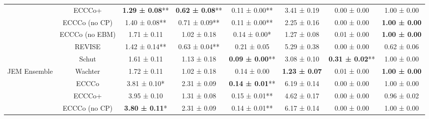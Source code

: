 \begin{table}
{\begin{tabular}[t]{cccccccc}
 & ECCCo+ & \textbf{1.29 ± 0.08}** & \textbf{0.62 ± 0.08}** & 0.11 ± 0.00** & 3.41 ± 0.19\hphantom{*}\hphantom{*} & 0.00 ± 0.00\hphantom{*}\hphantom{*} & 1.00 ± 0.00\hphantom{*}\hphantom{*}\\

 & ECCCo (no CP) & 1.40 ± 0.08** & 0.71 ± 0.09** & 0.11 ± 0.00** & 2.25 ± 0.16\hphantom{*}\hphantom{*} & 0.00 ± 0.00\hphantom{*}\hphantom{*} & \textbf{1.00 ± 0.00}\hphantom{*}\hphantom{*}\\

 & ECCCo (no EBM) & 1.71 ± 0.11\hphantom{*}\hphantom{*} & 1.02 ± 0.18\hphantom{*}\hphantom{*} & 0.14 ± 0.00*\hphantom{*} & 1.27 ± 0.08\hphantom{*}\hphantom{*} & 0.01 ± 0.00\hphantom{*}\hphantom{*} & \textbf{1.00 ± 0.00}\hphantom{*}\hphantom{*}\\

 & REVISE & 1.42 ± 0.14** & 0.63 ± 0.04** & 0.21 ± 0.05\hphantom{*}\hphantom{*} & 5.29 ± 0.38\hphantom{*}\hphantom{*} & 0.00 ± 0.00\hphantom{*}\hphantom{*} & 0.62 ± 0.06\hphantom{*}\hphantom{*}\\

 & Schut & 1.61 ± 0.11\hphantom{*}\hphantom{*} & 1.13 ± 0.18\hphantom{*}\hphantom{*} & \textbf{0.09 ± 0.00}** & 3.08 ± 0.10\hphantom{*}\hphantom{*} & \textbf{0.31 ± 0.02}** & 1.00 ± 0.00\hphantom{*}\hphantom{*}\\

\multirow[t]{-7}{*}{\centering\arraybackslash JEM Ensemble} & Wachter & 1.72 ± 0.11\hphantom{*}\hphantom{*} & 1.02 ± 0.18\hphantom{*}\hphantom{*} & 0.14 ± 0.00\hphantom{*}\hphantom{*} & \textbf{1.23 ± 0.07}\hphantom{*}\hphantom{*} & 0.01 ± 0.00\hphantom{*}\hphantom{*} & \textbf{1.00 ± 0.00}\hphantom{*}\hphantom{*}\\
\cmidrule{1-8}
 & ECCCo & 3.81 ± 0.10*\hphantom{*} & 2.31 ± 0.09\hphantom{*}\hphantom{*} & \textbf{0.14 ± 0.01}** & 6.19 ± 0.14\hphantom{*}\hphantom{*} & 0.00 ± 0.00\hphantom{*}\hphantom{*} & 1.00 ± 0.00\hphantom{*}\hphantom{*}\\

 & ECCCo+ & 3.95 ± 0.10\hphantom{*}\hphantom{*} & 1.31 ± 0.08\hphantom{*}\hphantom{*} & 0.15 ± 0.01** & 4.62 ± 0.17\hphantom{*}\hphantom{*} & 0.00 ± 0.00\hphantom{*}\hphantom{*} & 0.96 ± 0.02\hphantom{*}\hphantom{*}\\

 & ECCCo (no CP) & \textbf{3.80 ± 0.11}*\hphantom{*} & 2.31 ± 0.09\hphantom{*}\hphantom{*} & 0.14 ± 0.01** & 6.17 ± 0.14\hphantom{*}\hphantom{*} & 0.00 ± 0.00\hphantom{*}\hphantom{*} & 1.00 ± 0.00\hphantom{*}\hphantom{*}\\


\end{tabular}}
\end{table}

